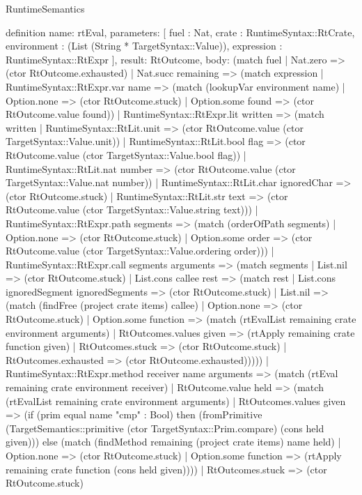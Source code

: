 \begin{lexlean}{RuntimeSemantics}
\begin{semanticmodule}
definition{
  name: rtEval,
  parameters: [
    fuel : Nat,
    crate : RuntimeSyntax::RtCrate,
    environment : (List (String * TargetSyntax::Value)),
    expression : RuntimeSyntax::RtExpr
  ],
  result: RtOutcome,
  body: (match fuel
    | Nat.zero => (ctor RtOutcome.exhausted)
    | Nat.succ remaining => (match expression
      | RuntimeSyntax::RtExpr.var name => (match (lookupVar environment name)
        | Option.none => (ctor RtOutcome.stuck)
        | Option.some found => (ctor RtOutcome.value found))
      | RuntimeSyntax::RtExpr.lit written => (match written
        | RuntimeSyntax::RtLit.unit => (ctor RtOutcome.value (ctor TargetSyntax::Value.unit))
        | RuntimeSyntax::RtLit.bool flag => (ctor RtOutcome.value (ctor TargetSyntax::Value.bool flag))
        | RuntimeSyntax::RtLit.nat number => (ctor RtOutcome.value (ctor TargetSyntax::Value.nat number))
        | RuntimeSyntax::RtLit.char ignoredChar => (ctor RtOutcome.stuck)
        | RuntimeSyntax::RtLit.str text => (ctor RtOutcome.value (ctor TargetSyntax::Value.string text)))
      | RuntimeSyntax::RtExpr.path segments => (match (orderOfPath segments)
        | Option.none => (ctor RtOutcome.stuck)
        | Option.some order => (ctor RtOutcome.value (ctor TargetSyntax::Value.ordering order)))
      | RuntimeSyntax::RtExpr.call segments arguments => (match segments
        | List.nil => (ctor RtOutcome.stuck)
        | List.cons callee rest => (match rest
          | List.cons ignoredSegment ignoredSegments => (ctor RtOutcome.stuck)
          | List.nil => (match (findFree (project crate items) callee)
            | Option.none => (ctor RtOutcome.stuck)
            | Option.some function => (match (rtEvalList remaining crate environment arguments)
              | RtOutcomes.values given => (rtApply remaining crate function given)
              | RtOutcomes.stuck => (ctor RtOutcome.stuck)
              | RtOutcomes.exhausted => (ctor RtOutcome.exhausted)))))
      | RuntimeSyntax::RtExpr.method receiver name arguments => (match (rtEval remaining crate environment receiver)
        | RtOutcome.value held => (match (rtEvalList remaining crate environment arguments)
          | RtOutcomes.values given => (if (prim equal name "cmp" : Bool) then (fromPrimitive (TargetSemantics::primitive (ctor TargetSyntax::Prim.compare) (cons held given))) else (match (findMethod remaining (project crate items) name held)
            | Option.none => (ctor RtOutcome.stuck)
            | Option.some function => (rtApply remaining crate function (cons held given))))
          | RtOutcomes.stuck => (ctor RtOutcome.stuck)
}
\end{semanticmodule}
\end{lexlean}
